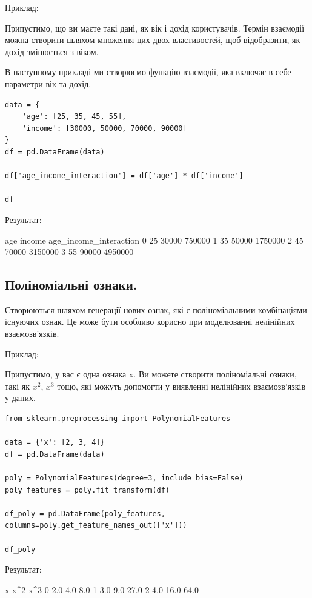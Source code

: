 Приклад:

Припустимо, що ви маєте такі дані, як вік і дохід користувачів. Термін взаємодії 
можна створити шляхом множення цих двох властивостей, щоб відобразити, як дохід 
змінюється з віком.

В наступному прикладі ми створюємо функцію взаємодії, яка включає в себе параметри вік та дохід. 

\begin{lstlisting}
data = {
    'age': [25, 35, 45, 55],
    'income': [30000, 50000, 70000, 90000]
}
df = pd.DataFrame(data)

df['age_income_interaction'] = df['age'] * df['income']

df
\end{lstlisting}

Результат:

\begin{console}
	age	income	age_income_interaction
0	25	30000	750000
1	35	50000	1750000
2	45	70000	3150000
3	55	90000	4950000
\end{console}



\subsection{Поліноміальні ознаки.}

Створюються шляхом генерації нових ознак, які є поліноміальними комбінаціями існуючих ознак. 
Це може бути особливо корисно при моделюванні нелінійних взаємозв'язків.

Приклад:

Припустимо, у вас є одна ознака x. Ви можете створити поліноміальні ознаки, такі як $x^2$, $x^3$ 
тощо, які можуть допомогти у виявленні нелінійних взаємозв'язків у даних.

\begin{lstlisting}
from sklearn.preprocessing import PolynomialFeatures

data = {'x': [2, 3, 4]}
df = pd.DataFrame(data)

poly = PolynomialFeatures(degree=3, include_bias=False)
poly_features = poly.fit_transform(df)

df_poly = pd.DataFrame(poly_features, columns=poly.get_feature_names_out(['x']))

df_poly
\end{lstlisting}

Результат:

\begin{console}
	x	x^2	x^3
0	2.0	4.0	8.0
1	3.0	9.0	27.0
2	4.0	16.0	64.0
\end{console}

